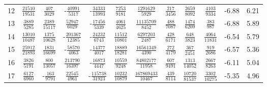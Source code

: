 \begin{sidewaystable}
\begin{tabular}{r|ccccccccc|c@{ -- }c@{\%}}
12
&  $\frac{           21510}{           19531}$
&  $\frac{             407}{            3029}$
& -$\frac{           40991}{            5317}$
& -$\frac{           34333}{           13993}$
&  $\frac{            7253}{            9181}$
&  $\frac{         1291629}{            5929}$
&  $\frac{             217}{            3456}$
&  $\frac{            2659}{            8092}$
&  $\frac{            4103}{            9334}$
&  -6.88 &  6.21
\\
13
&  $\frac{            3889}{            5285}$
&  $\frac{            2389}{           15117}$
&  $\frac{           52947}{            6029}$
& -$\frac{           17456}{            5339}$
&  $\frac{            4061}{            4625}$
&  $\frac{        11135709}{            8452}$
&  $\frac{             488}{            7087}$
&  $\frac{            1474}{            6209}$
&  $\frac{             383}{             987}$
&  -6.88 &  5.89
\\
14
&  $\frac{           13010}{           10487}$
&  $\frac{            1375}{           10628}$
& -$\frac{          201367}{           12385}$
& -$\frac{           24232}{            6743}$
&  $\frac{           11512}{           10801}$
&  $\frac{         6297203}{            2487}$
&  $\frac{             428}{            6171}$
&  $\frac{             648}{            3823}$
&  $\frac{            4064}{           11831}$
&  -6.54 &  5.79
\\
15
&  $\frac{           25912}{           21893}$
&  $\frac{            1831}{           16699}$
& -$\frac{           58570}{            4063}$
& -$\frac{           14377}{            4017}$
&  $\frac{           18889}{           18281}$
&  $\frac{        16561349}{            4390}$
&  $\frac{             272}{            4179}$
&  $\frac{             367}{            2451}$
&  $\frac{             919}{            2686}$
&  -6.57 &  5.36
\\
16
&  $\frac{            3826}{            5191}$
&  $\frac{             800}{           13057}$
&  $\frac{          213790}{           16397}$
& -$\frac{           16873}{            4447}$
&  $\frac{           10559}{            9248}$
&  $\frac{        84802177}{           11958}$
&  $\frac{             607}{            9491}$
&  $\frac{            1313}{           14052}$
&  $\frac{            2667}{            8263}$
&  -6.11 &  5.04
\\
17
&  $\frac{            6127}{            6960}$
& -$\frac{             163}{            9791}$
&  $\frac{           22545}{            4961}$
& -$\frac{          115738}{           31923}$
&  $\frac{           10232}{           10879}$
&  $\frac{       167869433}{           10467}$
&  $\frac{             439}{            8114}$
&  $\frac{           10720}{           81537}$
&  $\frac{            3302}{           10275}$
&  -5.35 &  4.96
\end{tabular}
\end{sidewaystable}

